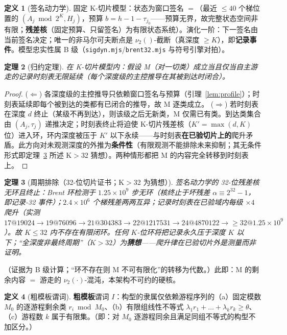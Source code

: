 \documentclass[11pt]{ctexart}
\newtheorem{theorem}{定理}[section]
\theoremstyle{definition}
\newtheorem{definition}[theorem]{定义}
\newcommand{\vtwo}[1]{\nu_2(#1)}
\begin{document}
\begin{definition}[签名动力学]\label{def:sig}
固定 K-切片模型：状态为窗口签名 $=$（最近 $\le40$ 个梯位置的 $(A_j\bmod 2^{K},H_j)$，预算 $b=h{-}1{-}\tau_{j_0}$——预算无界，故完整状态空间非有限；\textbf{残差核}（固定预算、只留签名）为有限状态系统）。演化一阶：下一签名由当前签名决定；唯一的非马尔可夫断点是 $\vtwo{}$-截断（真深度 $\ge K$），即\textbf{记录事件}。模型忠实性属 B 级（\texttt{sigdyn.mjs}/\texttt{brent32.mjs} 与符号引擎对拍）。
\end{definition}

\begin{theorem}[归约定理]\label{thm:reduce}
在 K-切片模型内：假设 M（对一切类）成立当且仅当自主游走的记录时刻表无限延续（每个深度级的主控推导在其被到达时闭合）。
\end{theorem}
\begin{proof}
($\Leftarrow$) 各深度级的主控推导只依赖窗口签名与预算（引理~\ref{lem:profile}）；时刻表延续即每个被到达的类都有已闭合的推导，故 M 逐类成立。
($\Rightarrow$) 若时刻表在深度 $d$ 终止（某级不再到达），则该级之后无新类，M 仅需已有类。到达类集合由 $(A_j,\tau_j)$ 递推决定；时刻表终止将迫使 K-切片残差核（$K'=\max(d,K)$ 位）进入环，环内深度被压于 $K'$ 以下永续——与时刻表\textbf{在已验切片上的}爬升矛盾。此方向对未观测深度的外推为\textbf{条件性}（有限观测不能排除未来抑制；其无条件形式即定理~\ref{thm:nocycle} 所述 K$>$32 猜想）。两种情形都把 M 的内容完全转移到时刻表上。
\end{proof}

\begin{theorem}[周期排除（32-位切片证书；K$>$32 为猜想）]\label{thm:nocycle}
签名动力学的 32-位残差核无环且终止：Brent 环检测于 $1.25\times10^9$ 步无环（核终止于坏残差 $\alpha\equiv2^{32}{-}1$，即记录-32 事件）；$2.4\times10^6$ 个梯残差两两互异；记录时刻表在已验域内每级 $\times4$ 爬升（实测 $17@19024\to19@76096\to21@304383\to22@1217531\to24@4870122\to\ge32@1.25\times10^9$）。故 $K\le32$ 内不存在有限闭环。任何 $K$-位环将把记录永久压于深度 $K$ 以下；``全深度非最终周期''（$K>32$）为\textbf{猜想}——爬升律在已验切片外是测量而非证明。
\end{theorem}
（证据为 B 级计算；``环不存在则 M 不可有限化''的转移为代数。）此即：M 的剩余内容 $=$ 游走的 $\vtwo{\cdot}$-混沌，本架构不可约的硬核。

\begin{definition}[粗模板谓词]\label{def:template}
\textbf{粗模板}谓词 $I$：构型的隶属仅依赖游程序列的（a）固定模数 $M_0$ 的逐游程剩余类 $r_i\bmod M_0$、（b）有限组线性不等式 $\lambda_1 r_1+\dots+\lambda_k r_k\ge\theta$、（c）游程数 $k$ 属于有限集。（即：对 $M_0$ 逐游程同余且满足同组不等式的构型不加区分。）
\end{definition}
\end{document}
